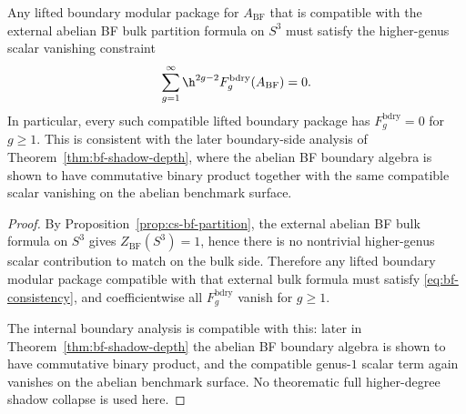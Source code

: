 \begin{theorem}
\label{thm:bf-boundary-bulk-consistency}
Any lifted boundary modular package for $A_{\mathrm{BF}}$ that is compatible with
the external abelian BF bulk partition formula on $S^3$ must satisfy the
higher-genus scalar vanishing constraint
\begin{equation}
\label{eq:bf-consistency}
\sum_{g=1}^{\infty} \h^{2g-2} F_g^{\mathrm{bdry}}(A_{\mathrm{BF}}) = 0.
\end{equation}
In particular, every such compatible lifted boundary package has
$F_g^{\mathrm{bdry}} = 0$ for $g \geq 1$. This is consistent with the later
boundary-side analysis of Theorem~\ref{thm:bf-shadow-depth}, where the abelian BF
boundary algebra is shown to have commutative binary product together with the
same compatible scalar vanishing on the abelian benchmark surface.
\end{theorem}

\begin{proof}
By Proposition~\ref{prop:cs-bf-partition}, the external abelian BF bulk formula on
$S^3$ gives $Z_{\mathrm{BF}}(S^3)=1$, hence there is no nontrivial higher-genus scalar
contribution to match on the bulk side. Therefore any lifted boundary modular
package compatible with that external bulk formula must satisfy
\eqref{eq:bf-consistency}, and coefficientwise all
$F_g^{\mathrm{bdry}}$ vanish for $g\geq 1$.

The internal boundary analysis is compatible with this: later in
Theorem~\ref{thm:bf-shadow-depth} the abelian BF boundary algebra is shown to have
commutative binary product, and the compatible genus-$1$ scalar term again
vanishes on the abelian benchmark surface. No theorematic full higher-degree
shadow collapse is used here.
\end{proof}

